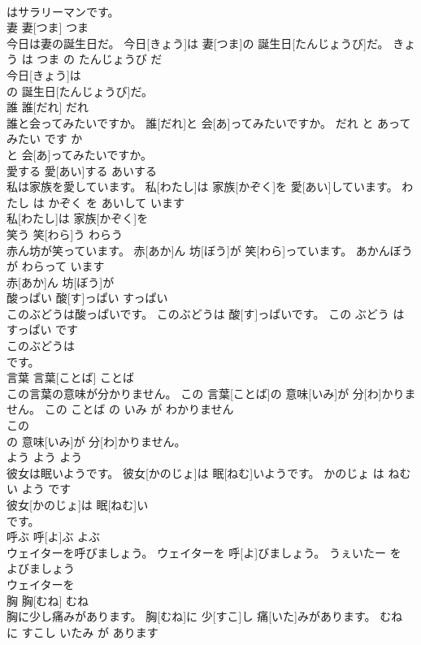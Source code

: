 \documentclass[8pt]{extreport}
\begin{document}
\begin{CJK}{UTF8}{min}
\\	はサラリーマンです。			
\\	妻	妻[つま]	つま	
\\	今日は妻の誕生日だ。	今日[きょう]は 妻[つま]の 誕生日[たんじょうび]だ。	きょう は つま の たんじょうび だ	
\\	今日[きょう]は
\\	の 誕生日[たんじょうび]だ。			
\\	誰	誰[だれ]	だれ	
\\	誰と会ってみたいですか。	誰[だれ]と 会[あ]ってみたいですか。	だれ と あって みたい です か	
\\	と 会[あ]ってみたいですか。			
\\	愛する	愛[あい]する	あいする	
\\	私は家族を愛しています。	私[わたし]は 家族[かぞく]を 愛[あい]しています。	わたし は かぞく を あいして います	
\\	私[わたし]は 家族[かぞく]を
\\	笑う	笑[わら]う	わらう	
\\	赤ん坊が笑っています。	赤[あか]ん 坊[ぼう]が 笑[わら]っています。	あかんぼう が わらって います	
\\	赤[あか]ん 坊[ぼう]が
\\	酸っぱい	酸[す]っぱい	すっぱい	
\\	このぶどうは酸っぱいです。	このぶどうは 酸[す]っぱいです。	この ぶどう は すっぱい です	
\\	このぶどうは
\\	です。			
\\	言葉	言葉[ことば]	ことば	
\\	この言葉の意味が分かりません。	この 言葉[ことば]の 意味[いみ]が 分[わ]かりません。	この ことば の いみ が わかりません	
\\	この
\\	の 意味[いみ]が 分[わ]かりません。			
\\	よう	よう	よう	
\\	彼女は眠いようです。	彼女[かのじょ]は 眠[ねむ]いようです。	かのじょ は ねむい よう です	
\\	彼女[かのじょ]は 眠[ねむ]い
\\	です。			
\\	呼ぶ	呼[よ]ぶ	よぶ	
\\	ウェイターを呼びましょう。	ウェイターを 呼[よ]びましょう。	うぇいたー を よびましょう	
\\	ウェイターを
\\	胸	胸[むね]	むね	
\\	胸に少し痛みがあります。	胸[むね]に 少[すこ]し 痛[いた]みがあります。	むね に すこし いたみ が あります	

\end{CJK}
\end{document}
